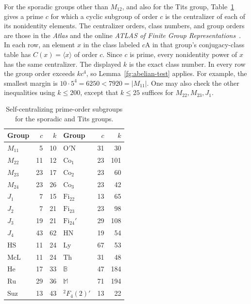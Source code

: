 For the sporadic groups other than $M_{12}$, and also for the Tits group,
Table~\ref{fg:table-sporadic} gives a prime $c$ for which a cyclic
subgroup of order $c$ is the centralizer of each of its nonidentity
elements. The centralizer orders, class numbers, and group orders are
those in the \emph{Atlas} and the online \emph{ATLAS of Finite Group
Representations}~\cite{Atlas,AtlasOnline}. In each row, an element $x$
in the class labeled $c\mathrm A$ in that group's conjugacy-class table
has $C(x)=\langle x\rangle$ of order $c$. Since $c$ is prime, every
nonidentity power of $x$ has the same centralizer.
The displayed $k$ is the exact class number. In every row the group
order exceeds $kc^4$, so Lemma~\ref{fg:abelian-test} applies.
For example, the smallest margin is $10\cdot5^4=6250<7920=|M_{11}|$.
One may also check the other inequalities using $k\le200$, except that
$k\le25$ suffices for $M_{22},M_{23},J_1$.

\begin{table}[htbp]
\centering
\small
\begin{tabular}{lrr@{\qquad}lrr}
\toprule
Group & $c$ & $k$ & Group & $c$ & $k$\\
\midrule
$M_{11}$ & 5 & 10 & $\mathrm{O'N}$ & 31 & 30\\
$M_{22}$ & 11 & 12 & $\mathrm{Co}_1$ & 23 & 101\\
$M_{23}$ & 23 & 17 & $\mathrm{Co}_2$ & 23 & 60\\
$M_{24}$ & 23 & 26 & $\mathrm{Co}_3$ & 23 & 42\\
$J_1$ & 7 & 15 & $\mathrm{Fi}_{22}$ & 13 & 65\\
$J_2$ & 7 & 21 & $\mathrm{Fi}_{23}$ & 23 & 98\\
$J_3$ & 19 & 21 & $\mathrm{Fi}_{24}'$ & 29 & 108\\
$J_4$ & 43 & 62 & $\mathrm{HN}$ & 19 & 54\\
$\mathrm{HS}$ & 11 & 24 & $\mathrm{Ly}$ & 67 & 53\\
$\mathrm{McL}$ & 11 & 24 & $\mathrm{Th}$ & 31 & 48\\
$\mathrm{He}$ & 17 & 33 & $\mathbb B$ & 47 & 184\\
$\mathrm{Ru}$ & 29 & 36 & $\mathbb M$ & 71 & 194\\
$\mathrm{Suz}$ & 13 & 43 & ${}^2F_4(2)'$ & 13 & 22\\
\bottomrule
\end{tabular}
\caption{Self-centralizing prime-order subgroups for the sporadic and
Tits groups.}\label{fg:table-sporadic}
\end{table}

